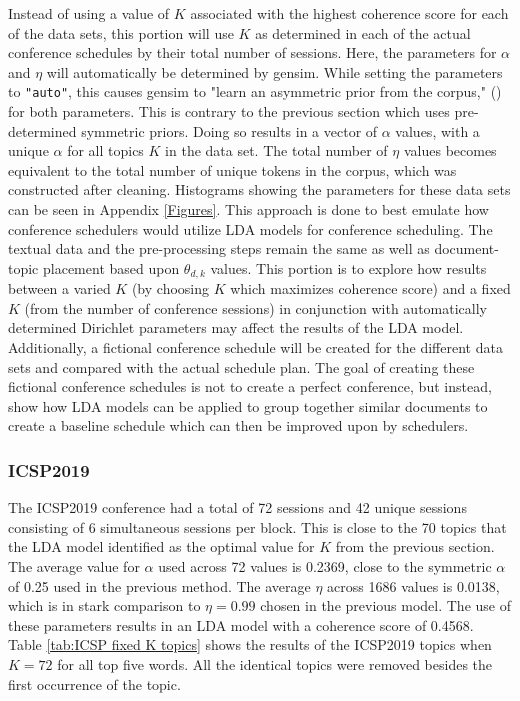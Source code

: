 \documentclass[a4paper, 12pt, twoside]{article}
\numberwithin{equation}{section} %
\begin{document}
Instead of using a value of $K$ associated with the highest coherence score for each of the data sets, this portion will use $K$ as determined in each of the actual conference schedules by their total number of sessions. Here, the parameters for $\alpha$ and $\eta$ will automatically be determined by gensim. While setting the parameters to \texttt{"auto"}, this causes gensim to "learn an asymmetric prior from the corpus," (\cite{gensim}) for both parameters. This is contrary to the previous section which uses pre-determined symmetric priors. Doing so results in a vector of $\alpha$ values, with a unique $\alpha$ for all topics $K$ in the data set. The total number of $\eta$ values becomes equivalent to the total number of unique tokens in the corpus, which was constructed after cleaning. Histograms showing the parameters for these data sets can be seen in Appendix \ref{Figures}. This approach is done to best emulate how conference schedulers would utilize LDA models for conference scheduling. The textual data and the pre-processing steps remain the same as well as document-topic placement based upon $\theta_{d,k}$ values. This portion is to explore how results between a varied $K$ (by choosing $K$ which maximizes coherence score) and a fixed $K$ (from the number of conference sessions) in conjunction with automatically determined Dirichlet parameters may affect the results of the LDA model. Additionally, a fictional conference schedule will be created for the different data sets and compared with the actual schedule plan. The goal of creating these fictional conference schedules is not to create a perfect conference, but instead, show how LDA models can be applied to group together similar documents to create a baseline schedule which can then be improved upon by schedulers. 

\subsubsection{ICSP2019}

The ICSP2019 conference had a total of 72 sessions and 42 unique sessions consisting of 6 simultaneous sessions per block. This is close to the 70 topics that the LDA model identified as the optimal value for $K$ from the previous section. The average value for $\alpha$ used across 72 values is 0.2369, close to the symmetric $\alpha$ of 0.25 used in the previous method. The average $\eta$ across 1686 values is 0.0138, which is in stark comparison to $\eta = 0.99$ chosen in the previous model. The use of these parameters results in an LDA model with a coherence score of 0.4568. Table \ref{tab:ICSP fixed K topics} shows the results of the ICSP2019 topics when $K = 72$ for all top five words. All the identical topics were removed besides the first occurrence of the topic. 
\end{document}
